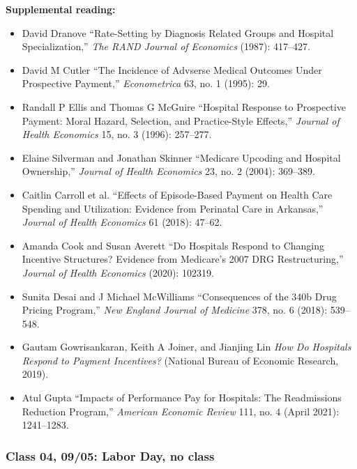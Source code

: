\documentclass[11pt,]{article}
\providecommand{\tightlist}{%
  \setlength{\itemsep}{0pt}\setlength{\parskip}{0pt}}
\begin{document}
\textbf{Supplemental reading:}

\begin{itemize}
\tightlist
\item
  David Dranove {``Rate-Setting by Diagnosis Related Groups and Hospital
  Specialization,''} \emph{The RAND Journal of Economics} (1987):
  417--427.
\item
  David M Cutler {``The {Incidence} of {Advserse} {Medical} {Outcomes}
  Under {Prospective} {Payment},''} \emph{Econometrica} 63, no. 1
  (1995): 29.
\item
  Randall P Ellis and Thomas G McGuire {``Hospital Response to
  Prospective Payment: Moral Hazard, Selection, and Practice-Style
  Effects,''} \emph{Journal of Health Economics} 15, no. 3 (1996):
  257--277.
\item
  Elaine Silverman and Jonathan Skinner {``Medicare Upcoding and
  Hospital Ownership,''} \emph{Journal of Health Economics} 23, no. 2
  (2004): 369--389.
\item
  Caitlin Carroll et al. {``Effects of Episode-Based Payment on Health
  Care Spending and Utilization: {Evidence} from Perinatal Care in
  {Arkansas},''} \emph{Journal of Health Economics} 61 (2018): 47--62.
\item
  Amanda Cook and Susan Averett {``Do {Hospitals} {Respond} to
  {Changing} {Incentive} {Structures}? {Evidence} from {Medicare}'s 2007
  {DRG} {Restructuring},''} \emph{Journal of Health Economics} (2020):
  102319.
\item
  Sunita Desai and J Michael McWilliams {``Consequences of the {340b}
  Drug Pricing Program,''} \emph{New England Journal of Medicine} 378,
  no. 6 (2018): 539--548.
\item
  Gautam Gowrisankaran, Keith A Joiner, and Jianjing Lin \emph{How Do
  {Hospitals} {Respond} to {Payment} {Incentives}?} (National Bureau of
  Economic Research, 2019).
\item
  Atul Gupta {``Impacts of {Performance} {Pay} for {Hospitals}: {The}
  {Readmissions} {Reduction} {Program},''} \emph{American Economic
  Review} 111, no. 4 (April 2021): 1241--1283.
\end{itemize}

\hypertarget{class-04-0905-labor-day-no-class}{%
\subsubsection{Class 04, 09/05: Labor Day, no
class}\label{class-04-0905-labor-day-no-class}}
\end{document}
